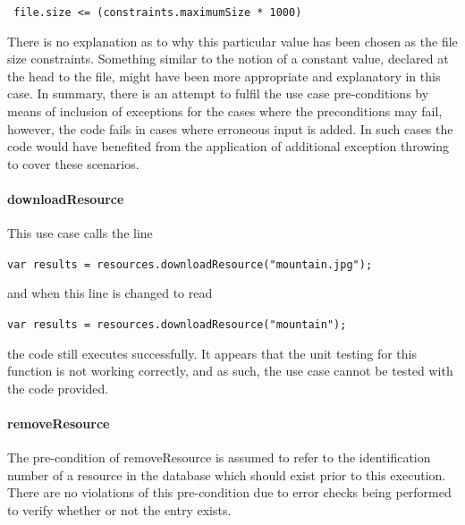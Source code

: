 \documentclass[a4paper]{article}
\begin{document}
\texttt{	file.size <= (constraints.maximumSize * 1000)}

There is no explanation as to why this particular value has been chosen as the file size constraints. Something similar to the notion of a constant value, declared at the head to the file, might have been more appropriate and explanatory in this case.
In summary, there is an attempt to fulfil the use case pre-conditions by means of inclusion of exceptions for the cases where the preconditions may fail, however, the code fails in cases where erroneous input is added. In such cases the code would have benefited from the application of additional exception throwing to cover these scenarios.

\paragraph{downloadResource} 

This use case calls the line 

\texttt{var results = resources.downloadResource("mountain.jpg");}

and when this line is changed to read

\texttt{var results = resources.downloadResource("mountain");}

the code still executes successfully. It appears that the unit testing for this function is not working correctly, and as such, the use case cannot be tested with the code provided. 

\paragraph{removeResource}
The pre-condition of removeResource is assumed to refer to the identification number of a resource in the database which should exist prior to this execution. There are no violations of this pre-condition due to error checks being performed to verify whether or not the entry exists.
\end{document}

